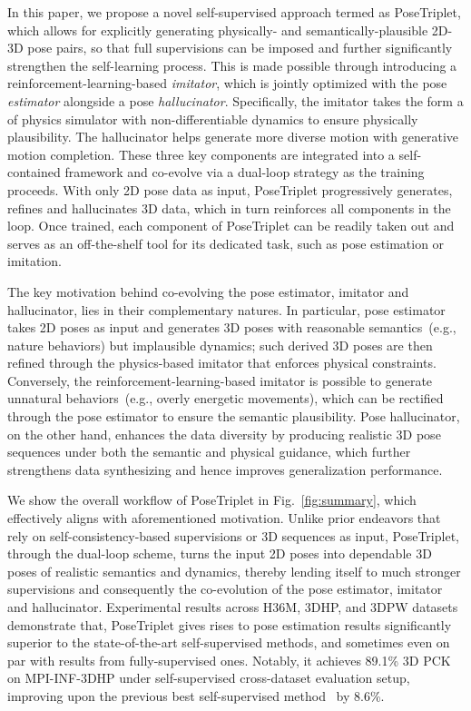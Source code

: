 \documentclass[10pt,twocolumn,letterpaper]{article}
\begin{document}
In this paper, we propose a novel 
self-supervised approach termed as PoseTriplet,
which allows for explicitly generating
physically- and semantically-plausible 
2D-3D pose pairs, so that full supervisions
can be imposed and further significantly strengthen the 
self-learning process.
This is made possible through introducing
a reinforcement-learning-based \emph{imitator},
which is jointly optimized with the pose \emph{estimator}
alongside a pose \emph{hallucinator}.
Specifically, the imitator takes the form
a of physics simulator with non-differentiable dynamics {to ensure physically plausibility}.
The hallucinator helps generate more diverse motion with generative motion completion.
These three key components
are integrated into a self-contained
framework and co-evolve
via a dual-loop strategy
as the training proceeds.
With only 2D pose data as input,
PoseTriplet progressively generates,
refines and hallucinates 
3D data, which in turn reinforces
all components in the loop.
Once trained, each component 
of PoseTriplet 
can be readily taken out and serves
as an off-the-shelf 
tool for its dedicated task,
such as pose estimation or imitation. 



The key motivation behind co-evolving the 
pose estimator, imitator and hallucinator,
lies in their complementary natures. In particular,
pose estimator takes 2D poses as input and generates
3D poses with reasonable semantics~(e.g., nature behaviors) but 
implausible dynamics;
such derived 3D poses are then refined through 
the physics-based imitator that enforces physical constraints.
Conversely, 
the reinforcement-learning-based imitator is {possible} to
generate unnatural behaviors~(e.g., overly energetic movements), 
which can be rectified through the pose estimator to
ensure the semantic plausibility.
Pose hallucinator, on the other hand, 
enhances the data diversity 
by producing realistic 3D pose sequences
under both the semantic and physical guidance,
which further strengthens data 
synthesizing 
and hence {improves} generalization performance. 

We show the overall workflow of PoseTriplet in Fig.~\ref{fig:summary},
which effectively aligns with aforementioned motivation. 
Unlike prior endeavors that rely on self-consistency-based
supervisions or 3D sequences as input,
PoseTriplet,
through the dual-loop scheme,
turns the input 2D poses into 
dependable 3D poses of 
realistic semantics and dynamics,
thereby lending itself to 
much stronger supervisions
and consequently the co-evolution
of the pose estimator, 
imitator and hallucinator.
Experimental results across H36M, 3DHP, and 3DPW datasets
demonstrate that, 
PoseTriplet gives rises to 
pose estimation results significantly superior
to the state-of-the-art self-supervised methods,
and sometimes even on par with 
results from fully-supervised ones. 
{Notably, it achieves 89.1\% 3D PCK on MPI-INF-3DHP under self-supervised cross-dataset evaluation setup, improving upon the previous best self-supervised method~\cite{hu2021unsupervised, kundu2020self} by 8.6\%.}
\end{document}
